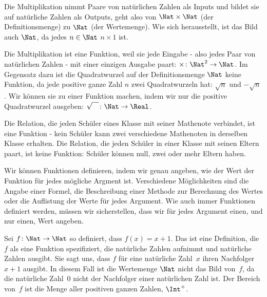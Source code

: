 \documentclass[../../../include/open-logic-section]{subfiles}
\begin{document}
  \begin{ex}
  Die Multiplikation nimmt Paare von natürlichen Zahlen als Inputs und bildet sie
  auf natürliche Zahlen als Outputs, geht also von $\Nat \times \Nat$ (der Definitionsmenge) zu $\Nat$ (der Wertemenge). Wie sich herausstellt, ist das Bild auch
  $\Nat$, da jedes $n \in \Nat$ $n \times 1$ ist.
  \end{ex}
  
  \begin{ex}
  Die Multiplikation ist eine Funktion, weil sie jede Eingabe - also jedes Paar
  von natürlichen Zahlen - mit einer einzigen Ausgabe paart: $\times \colon \Nat^2 \to
  \Nat$. Im Gegensatz dazu ist die Quadratwurzel auf der Definitionsmenge
  $\Nat$ keine Funktion, da jede positive ganze Zahl $n$ zwei
  Quadratwurzeln hat: $\sqrt{n}$ und $-\sqrt{n}$. Wir können sie zu einer Funktion machen, indem wir
  nur die positive Quadratwurzel ausgeben: $\sqrt{\phantom{X}} \colon
  \Nat \to \Real$. 
  \end{ex}
  
  \begin{ex}
  Die Relation, die jeden Schüler eines Klasse mit seiner Mathenote verbindet,
  ist eine Funktion - kein Schüler kann zwei verschiedene Mathenoten in derselben Klasse erhalten. Die Relation, die jeden Schüler in einer Klasse mit seinen
  Eltern paart, ist keine Funktion: Schüler können null, zwei oder mehr Eltern haben.
  \end{ex}
  
  \begin{explain}
  Wir können Funktionen definieren, indem wir genau angeben, wie der
  Wert der Funktion für jedes mögliche Argment ist. Verschiedene Möglichkeiten
  sind die Angabe einer Formel, die Beschreibung einer Methode zur Berechnung
  des Wertes oder die Auflistung der Werte für jedes Argument. Wie auch immer Funktionen
  definiert werden, müssen wir sicherstellen, dass wir für jedes Argument einen,
  und nur einen, Wert angeben.
  \end{explain}
  
  
  \begin{ex}
  Sei $f \colon \Nat \to \Nat$ so definiert, dass $f(x) = x+1$. Das
  ist eine Definition, die $f$ als eine Funktion spezifiziert, die
  natürliche Zahlen aufnimmt und natürliche Zahlen ausgibt. Sie sagt uns, dass $f$ für eine
  natürliche Zahl~$x$ ihren Nachfolger~$x+1$ ausgibt.
  In diesem Fall ist die Wertemenge $\Nat$ nicht das Bild von~$f$, da die
  natürliche Zahl~$0$ nicht der Nachfolger einer natürlichen Zahl ist. Der
  Bereich von~$f$ ist die Menge aller positiven ganzen Zahlen, $\Int^{+}$.
  \end{ex}
  
\end{document}
